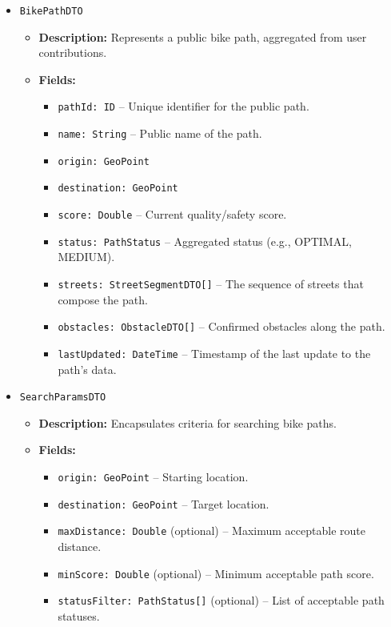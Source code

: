 \begin{itemize}
    \item \texttt{BikePathDTO}
    \begin{itemize}
        \item \textbf{Description:} Represents a public bike path, aggregated from user contributions.
        \item \textbf{Fields:}
        \begin{itemize}
            \item \texttt{pathId: ID} – Unique identifier for the public path.
            \item \texttt{name: String} – Public name of the path.
            \item \texttt{origin: GeoPoint}
            \item \texttt{destination: GeoPoint}
            \item \texttt{score: Double} – Current quality/safety score.
            \item \texttt{status: PathStatus} – Aggregated status (e.g., OPTIMAL, MEDIUM).
            \item \texttt{streets: StreetSegmentDTO[]} – The sequence of streets that compose the path.
            \item \texttt{obstacles: ObstacleDTO[]} – Confirmed obstacles along the path.
            \item \texttt{lastUpdated: DateTime} – Timestamp of the last update to the path's data.
        \end{itemize}
    \end{itemize}

    \item \texttt{SearchParamsDTO}
    \begin{itemize}
        \item \textbf{Description:} Encapsulates criteria for searching bike paths.
        \item \textbf{Fields:}
        \begin{itemize}
            \item \texttt{origin: GeoPoint} – Starting location.
            \item \texttt{destination: GeoPoint} – Target location.
            \item \texttt{maxDistance: Double} (optional) – Maximum acceptable route distance.
            \item \texttt{minScore: Double} (optional) – Minimum acceptable path score.
            \item \texttt{statusFilter: PathStatus[]} (optional) – List of acceptable path statuses.
        \end{itemize}
    \end{itemize}


\end{itemize}
